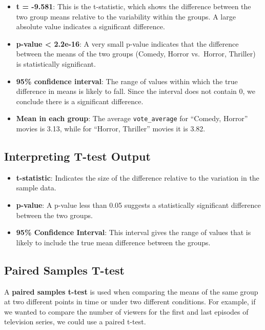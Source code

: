 \documentclass[
]{book}
\providecommand{\tightlist}{%
  \setlength{\itemsep}{0pt}\setlength{\parskip}{0pt}}
\begin{document}
\begin{itemize}
\tightlist
\item
  \textbf{t = -9.581}: This is the t-statistic, which shows the difference between the two group means relative to the variability within the groups. A large absolute value indicates a significant difference.
\item
  \textbf{p-value \textless{} 2.2e-16}: A very small p-value indicates that the difference between the means of the two groups (Comedy, Horror vs.~Horror, Thriller) is statistically significant.
\item
  \textbf{95\% confidence interval}: The range of values within which the true difference in means is likely to fall. Since the interval does not contain 0, we conclude there is a significant difference.
\item
  \textbf{Mean in each group}: The average \texttt{vote\_average} for ``Comedy, Horror'' movies is 3.13, while for ``Horror, Thriller'' movies it is 3.82.
\end{itemize}

\subsection*{Interpreting T-test Output}\label{interpreting-t-test-output}

\begin{itemize}
\tightlist
\item
  \textbf{t-statistic}: Indicates the size of the difference relative to the variation in the sample data.
\item
  \textbf{p-value}: A p-value less than 0.05 suggests a statistically significant difference between the two groups.
\item
  \textbf{95\% Confidence Interval}: This interval gives the range of values that is likely to include the true mean difference between the groups.
\end{itemize}

\subsection*{Paired Samples T-test}\label{paired-samples-t-test}

A \textbf{paired samples t-test} is used when comparing the means of the same group at two different points in time or under two different conditions. For example, if we wanted to compare the number of viewers for the first and last episodes of television series, we could use a paired t-test.
\end{document}
